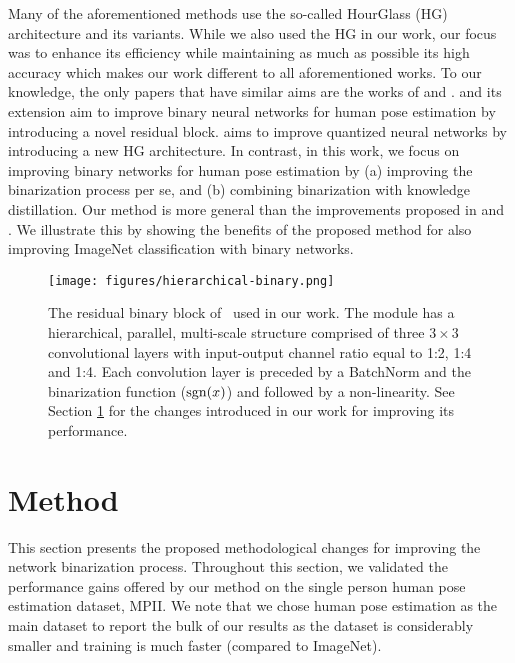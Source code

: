 \documentclass[10pt,twocolumn,letterpaper]{article}
\begin{document}
Many of the aforementioned methods use the so-called HourGlass (HG) architecture \cite{newell2016stacked} and its variants. 
While we also used the HG in our work, our focus was to enhance its efficiency while maintaining as much as possible its high accuracy which makes our work different to all aforementioned works. To our knowledge, the only papers that have similar aims are the works of \cite{bulat2017binarized}  and \cite{tang2018quantized}.
\cite{bulat2017binarized} and its extension \cite{bulat2018hierarchical} aim to improve binary neural networks for human pose estimation by introducing a novel residual block. \cite{tang2018quantized} aims to improve quantized neural networks by introducing a new HG architecture. In contrast, in this work, we focus on improving binary networks for human pose estimation by (a) improving the binarization process per se, and (b) combining binarization with knowledge distillation. Our method is more general than the improvements proposed in \cite{bulat2017binarized} and \cite{tang2018quantized}. We illustrate this by showing the benefits of the proposed method for also improving ImageNet classification with binary networks.


\begin{figure}[!htbp]


    \centering
    \texttt{[image: figures/hierarchical-binary.png]}
    \caption{The residual binary block of~\cite{bulat2018hierarchical} used in our work. The module has a hierarchical, parallel, multi-scale structure comprised of three $3\times3$ convolutional layers with input-output channel ratio equal to 1:2, 1:4 and 1:4. Each convolution layer is preceded by a BatchNorm and the binarization function ($\operatorname{sgn}(x)$) and followed by a non-linearity. See Section \ref{sec:binarization} for the changes introduced in our work for improving its performance.} \label{fig:multi-scale-block}

\end{figure}

\section{Method}\label{sec:binarization}

This section presents the proposed methodological changes for improving the network binarization process. Throughout this section, we validated the performance gains offered by our method on the single person human pose estimation dataset, MPII. We note that we chose human pose estimation as the main dataset to report the bulk of our results as the dataset is considerably smaller and training is much faster (compared to ImageNet).  
 
\end{document}
